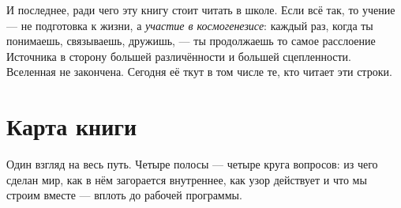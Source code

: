\documentclass[11pt,letterpaper]{article}
\newcommand{\voicerose}[4]{%
  \foreach \vang/\vcol in {90/cA,141.4/cS,192.8/cD,244.3/cL,295.7/cE,347.1/cO,38.6/cU}{%
    \draw[\vcol!55, thick] (#1,#2) -- ($(#1,#2)+(\vang:#3)$);
    \fill[\vcol] ($(#1,#2)+(\vang:#3)$) circle (#4);}}
\begin{document}
И последнее, ради чего эту книгу стоит читать в школе. Если всё
так, то учение --- не подготовка к жизни, а \emph{участие в
космогенезисе}: каждый раз, когда ты понимаешь, связываешь,
дружишь, --- ты продолжаешь то самое расслоение Источника в
сторону большей различённости и большей сцепленности. Вселенная
не закончена. Сегодня её ткут в том числе те, кто читает эти
строки.

\begin{center}
\end{center}

\clearpage
\section*{Карта книги}

Один взгляд на весь путь. Четыре полосы --- четыре круга вопросов:
из чего сделан мир, как в нём загорается внутреннее, как узор
действует и что мы строим вместе --- вплоть до рабочей программы.
\end{document}
